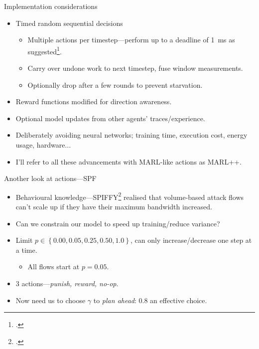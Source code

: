 \documentclass[aspectratio=169,xcolor={dvipsnames}
,hide notes
]{beamer}
\begin{document}
\begin{frame}{Implementation considerations}
	\begin{itemize}
		\item \alert{Timed random sequential decisions}
		\begin{itemize}
			\item Multiple actions per timestep---perform up to a deadline of \SI{1}{\milli\second} as suggested\footcite{DBLP:conf/sigcomm/ChenL0L18}.
			\item Carry over undone work to next timestep, fuse window measurements.
			\item Optionally drop after a few rounds to prevent starvation.
		\end{itemize}
		\item Reward functions modified for direction awareness.
		\item Optional model updates from other agents' traces/experience.
		\item Deliberately avoiding neural networks; training time, execution cost, energy usage, hardware...
		\item I'll refer to all these advancements with MARL-like actions as \alert{MARL++}.
	\end{itemize}
\end{frame}

\begin{frame}{Another look at actions---SPF}
\begin{itemize}
	\item Behavioural knowledge---SPIFFY\footcite{DBLP:conf/ndss/KangGS16} realised that \alert{volume-based attack flows can't scale up if they have their maximum bandwidth increased}.
	\item Can we constrain our model to speed up training/reduce variance?
	\item Limit $p \in \left\{ 0.00, 0.05, 0.25, 0.50, 1.0 \right\}$, can only increase/decrease one step at a time.
	\begin{itemize}
		\item All flows start at $p = 0.05$.
	\end{itemize}
	\item \alert{3 actions}---\emph{punish, reward, no-op}.
	\item Now need us to choose $\gamma$ to \emph{plan ahead}: 0.8 an effective choice.
\end{itemize}
\end{frame}
\end{document}
